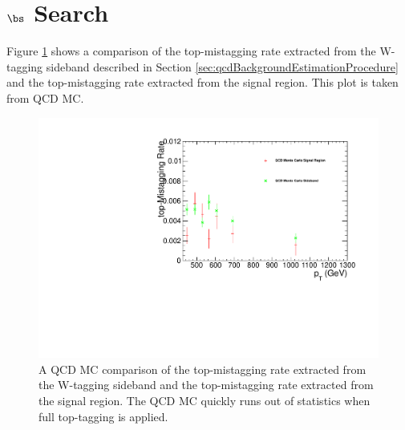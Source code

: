 



\section{$\bs$ Search}
\label{sec:appendix}
Figure \ref{figs:bsqcdtr} shows a comparison of the top-mistagging rate extracted from the W-tagging sideband described in Section \ref{sec:qcdBackgroundEstimationProcedure} and the top-mistagging rate extracted from the signal region.  
This plot is taken from QCD MC.

\begin{figure}[htcb]
\centering
\includegraphics[width=1.0\textwidth]{AN-14-049/figs/qcdtrcomp.pdf}
\caption{ 
A QCD MC comparison of the top-mistagging rate extracted from the W-tagging sideband and the top-mistagging rate extracted from the signal region.  The QCD MC quickly runs out of statistics when 
full top-tagging is applied.}
\label{figs:bsqcdtr}
\end{figure} 



